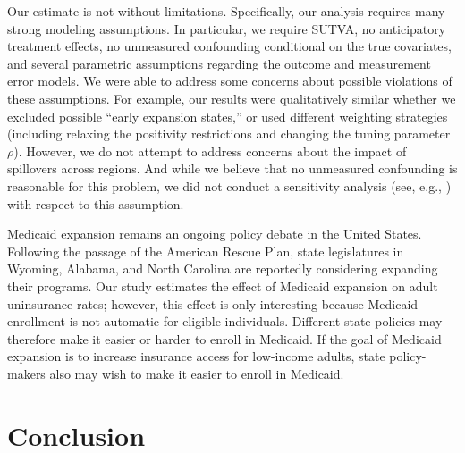 \documentclass[aoas]{imsart}
\theoremstyle{plain}
\theoremstyle{remark}
\begin{document}
Our estimate is not without limitations. Specifically, our analysis requires many strong modeling assumptions. In particular, we require SUTVA, no anticipatory treatment effects, no unmeasured confounding conditional on the true covariates, and several parametric assumptions regarding the outcome and measurement error models. We were able to address some concerns about possible violations of these assumptions. For example, our results were qualitatively similar whether we excluded possible ``early expansion states,'' or used different weighting strategies (including relaxing the positivity restrictions and changing the tuning parameter $\rho$). However, we do not attempt to address concerns about the impact of spillovers across regions. And while we believe that no unmeasured confounding is reasonable for this problem, we did not conduct a sensitivity analysis (see, e.g., \cite{bonvini2021sensitivity}) with respect to this assumption. 

Medicaid expansion remains an ongoing policy debate in the United States. Following the passage of the American Rescue Plan, state legislatures in Wyoming, Alabama, and North Carolina are reportedly considering expanding their programs. Our study estimates the effect of Medicaid expansion on adult uninsurance rates; however, this effect is only interesting because Medicaid enrollment is not automatic for eligible individuals. Different state policies may therefore make it easier or harder to enroll in Medicaid. If the goal of Medicaid expansion is to increase insurance access for low-income adults, state policy-makers also may wish to make it easier to enroll in Medicaid. 

\section{Conclusion}
\end{document}
